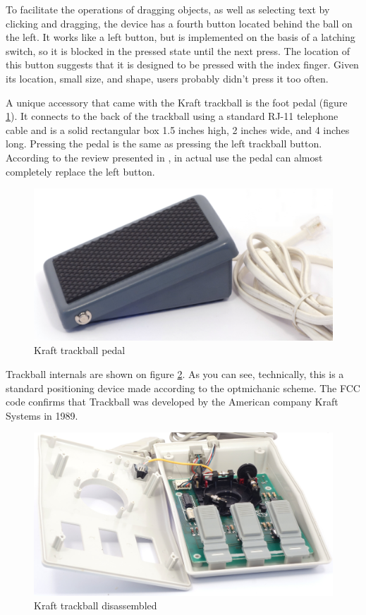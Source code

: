\documentclass[11pt, a4paper]{article}
\begin{document}
To facilitate the operations of dragging objects, as well as selecting text by clicking and dragging, the device has a fourth button located behind the ball on the left. It works like a left button, but is implemented on the basis of a latching switch, so it is blocked in the pressed state until the next press. The location of this button suggests that it is designed to be pressed with the index finger. Given its location, small size, and shape, users probably didn't press it too often.

A unique accessory that came with the Kraft trackball is the foot pedal (figure \ref{fig:KraftPedal}). It connects to the back of the trackball using a standard RJ-11 telephone cable and is a solid rectangular box 1.5 inches high, 2 inches wide, and 4 inches long. Pressing the pedal is the same as pressing the left trackball button. According to the review presented in \cite{kraftwithpedal}, in actual use the pedal can almost completely replace the left button.

\begin{figure}[h]
    \centering
    \includegraphics[scale=0.4]{1990_kraft_toptrack/pedal_30.jpg}
    \caption{Kraft trackball pedal}
    \label{fig:KraftPedal}
\end{figure}

Trackball internals are shown on figure \ref{fig:KraftInside}. As you can see, technically, this is a standard positioning device made according to the optmichanic scheme. The FCC code confirms that Trackball was developed by the American company Kraft Systems in 1989.

\begin{figure}[h]
    \centering
    \includegraphics[scale=0.6]{1989_kraft_trackball/inside_30.jpg}
    \caption{Kraft trackball disassembled}
    \label{fig:KraftInside}
\end{figure}
\end{document}
